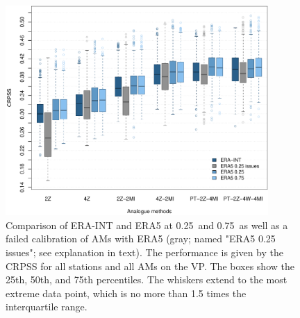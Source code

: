 \documentclass[alpha-refs]{wiley-article}
\begin{document}
\begin{figure}[bt]
	\centering
	\includegraphics[width=100mm]{figure-4.pdf}
	\caption{Comparison of ERA-INT and ERA5 at 0.25\degree\ and 0.75\degree\ as well as a failed calibration of AMs with ERA5 (gray; named "ERA5 0.25 issues"; see explanation in text). The performance is given by the CRPSS for all stations and all AMs on the VP. The boxes show the 25th, 50th, and 75th percentiles. The whiskers extend to the most extreme data point, which is no more than 1.5 times the interquartile range.}
	\label{fig:resolution}
\end{figure}
\end{document}
